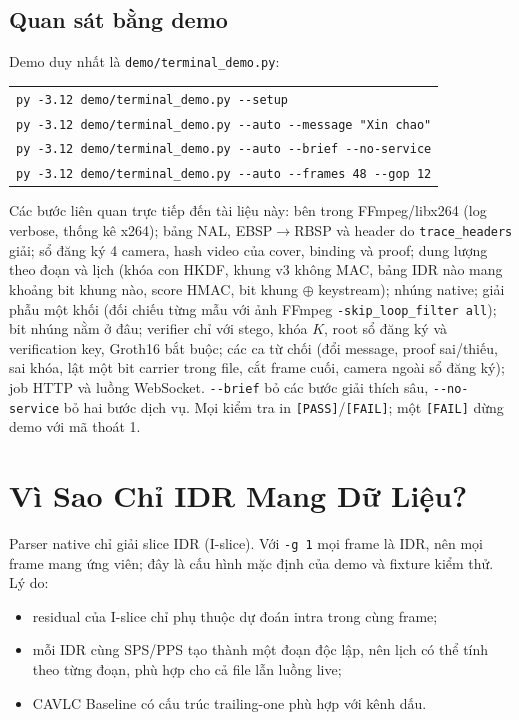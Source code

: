 \documentclass[11pt,a4paper]{article}
\begin{document}
\subsection{Quan sát bằng demo}

Demo duy nhất là \texttt{demo/terminal\_demo.py}:

\begin{center}
\small
\begin{tabular}{l}
\texttt{py -3.12 demo/terminal\_demo.py -{}-setup} \\
\texttt{py -3.12 demo/terminal\_demo.py -{}-auto -{}-message "Xin chao"} \\
\texttt{py -3.12 demo/terminal\_demo.py -{}-auto -{}-brief -{}-no-service} \\
\texttt{py -3.12 demo/terminal\_demo.py -{}-auto -{}-frames 48 -{}-gop 12} \\
\end{tabular}
\end{center}

Các bước liên quan trực tiếp đến tài liệu này: bên trong FFmpeg/libx264 (log
verbose, thống kê x264); bảng NAL, EBSP\(\rightarrow\)RBSP và header do
\texttt{trace\_headers} giải; sổ đăng ký 4 camera, hash video của cover, binding và
proof; dung lượng theo đoạn và lịch (khóa con HKDF, khung v3 không MAC, bảng IDR nào
mang khoảng bit khung nào, score HMAC, bit khung \(\oplus\) keystream); nhúng native;
giải phẫu một khối (đối chiếu từng mẫu với ảnh FFmpeg \texttt{-skip\_loop\_filter
all}); bit nhúng nằm ở đâu; verifier chỉ với stego, khóa \(K\), root sổ đăng ký và
verification key, Groth16 bắt buộc; các ca từ chối (đổi message, proof sai/thiếu,
sai khóa, lật một bit carrier trong file, cắt frame cuối, camera ngoài sổ đăng ký);
job HTTP và luồng WebSocket. \texttt{-{}-brief} bỏ các bước giải
thích sâu, \texttt{-{}-no-service} bỏ hai bước dịch vụ. Mọi kiểm tra in
\texttt{[PASS]}/\texttt{[FAIL]}; một \texttt{[FAIL]} dừng demo với mã thoát 1.

\section{Vì Sao Chỉ IDR Mang Dữ Liệu?}

Parser native chỉ giải slice IDR (I-slice). Với \texttt{-g 1} mọi frame là IDR, nên
mọi frame mang ứng viên; đây là cấu hình mặc định của demo và fixture kiểm thử. Lý do:

\begin{itemize}[leftmargin=*]
  \item residual của I-slice chỉ phụ thuộc dự đoán intra trong cùng frame;
  \item mỗi IDR cùng SPS/PPS tạo thành một đoạn độc lập, nên lịch có thể tính theo
  từng đoạn, phù hợp cho cả file lẫn luồng live;
  \item CAVLC Baseline có cấu trúc trailing-one phù hợp với kênh dấu.
\end{itemize}
\end{document}
